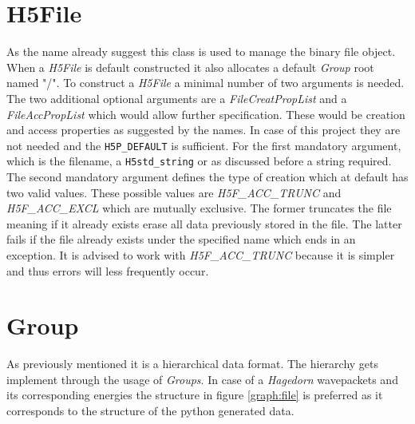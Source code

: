 \section{H5File}
\label{seq:h5file}
As the name already suggest this class is used to manage the binary file object. When a \textit{H5File} is default constructed it also allocates a default \textit{Group} root named "/". To construct a \textit{H5File} a minimal number of two arguments is needed. The two additional optional arguments are a \textit{FileCreatPropList} and a \textit{FileAccPropList} which would allow further specification. These would be creation and access properties as suggested by the names. In case of this project they are not needed and the \texttt{H5P\_DEFAULT} is sufficient. For the first mandatory argument, which is the filename, a \texttt{H5std\_string} or as discussed before a string required. The second mandatory argument defines the type of creation which at default has two valid values. These possible values are \textit{H5F\_ACC\_TRUNC} and \textit{H5F\_ACC\_EXCL} which are mutually exclusive. The former truncates the file meaning if it already exists erase all data previously stored in the file. The latter fails if the file already exists under the specified name which ends in an exception. It is advised to work with \textit{H5F\_ACC\_TRUNC} because it is simpler and thus errors will less frequently occur.

\section{Group}
\label{seq:group}
As previously mentioned it is a hierarchical data format. The hierarchy gets implement through the usage of \textit{Groups}. In case of a \textit{Hagedorn} wavepackets and its corresponding energies the structure in figure \ref{graph:file} is preferred as it corresponds to the structure of the python generated data.

